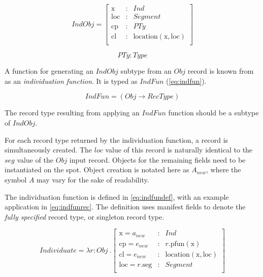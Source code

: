 \begin{equation}\label{eq:indobj}
IndObj = \left[\begin{array}{rcl}
\text{x} &:& Ind \\
\text{loc} &:& Segment \\
\text{cp} &:& PTy \\
\text{cl} &:& \text{location}(\text{x}, \text{loc}) \\
\end{array}\right]
\end{equation}

\begin{equation}\label{eq:pty}
PTy : Type
\end{equation}

A function for generating an $IndObj$ subtype from an $Obj$ record is known from \cite{lspc} as an \textit{individuation function}.
It is typed as $IndFun$ (\autoref{eq:indfun}).

\begin{equation}\label{eq:indfun}
IndFun = ( Obj \rightarrow RecType )
\end{equation}

The record type resulting from applying an $IndFun$ function should be a subtype of $IndObj$.

For each record type returned by the individuation function, a record is simultaneously created.
The $loc$ value of this record is naturally identical to the $seg$ value of the $Obj$ input record.
Objects for the remaining fields need to be instantiated on the spot.
Object creation is notated here as $A_{new}$, where the symbol $A$ may vary for the sake of readability.

The individuation function is defined in \autoref{eq:indfundef}, with an example application in \autoref{eq:indfunrec}.
The definition uses manifest fields to denote the \textit{fully specified} record type, or singleton record type.

\begin{equation}\label{eq:indfundef}
Individuate = \lambda r : Obj\ . \left[\begin{array}{lcl}
    \text{x} = a_{new} &:& Ind \\
    \text{cp} = e_{new} &:& r.\text{pfun}(\text{x}) \\
    \text{cl} = e_{new} &:& \text{location}(\text{x}, \text{loc}) \\
    \text{loc} = r.\text{seg} &:& Segment\\
\end{array}\right]
\end{equation}

